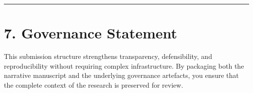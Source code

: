 \documentclass[
]{report}
\begin{document}
\begin{center}\rule{0.5\linewidth}{0.5pt}\end{center}

\chapter{7. Governance Statement}\label{governance-statement}

This submission structure strengthens transparency, defensibility, and
reproducibility without requiring complex infrastructure. By packaging
both the narrative manuscript and the underlying governance artefacts,
you ensure that the complete context of the research is preserved for
review.
\end{document}
